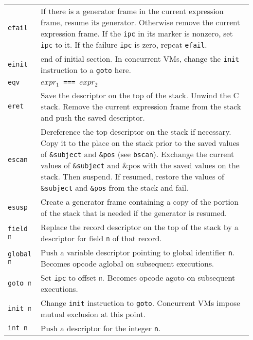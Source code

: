 \begin{xtabular}{l@{\hspace{1.5cm}}p{13.5cm}}
\texttt{efail} & If there is a generator frame in the current expression
frame, resume its generator. Otherwise remove the current expression
frame. If the \texttt{ipc} in its marker is nonzero, set \texttt{ipc} to it. If the
failure \texttt{ipc} is zero, repeat \texttt{efail}.\\

\texttt{\color{blue}einit} & end of initial section. In concurrent
 VMs, change the \texttt{init} instruction to a \texttt{goto} here. \\

\texttt{eqv}   & \texttt{$expr_1$ === $expr_2$}\\

\texttt{eret}  & Save the descriptor on the top of the stack. Unwind the C
stack. Remove the current expression frame from the stack and push the
saved descriptor.\\

\texttt{escan} & Dereference the top descriptor on the stack if necessary. Copy
it to the place on the stack prior to the saved values of \texttt{\&subject} and
\texttt{\&pos} (see \texttt{bscan}). Exchange the current values of
\texttt{\texttt{\&subject}} and \&pos with the saved values on the stack. Then
suspend. If resumed, restore the values of \texttt{\&subject} and \texttt{\&pos}
from the stack and fail.\\

\texttt{esusp} & Create a generator frame containing a copy of the portion of
the stack that is needed if the generator is resumed.\\

\texttt{field n} & Replace the record descriptor on the top of the stack by a
descriptor for field \texttt{n} of that record.\\

\texttt{global n} & Push a variable descriptor pointing to global
identifier \texttt{n}. Becomes opcode aglobal on subsequent executions.\\

\texttt{goto n} & Set \texttt{ipc} to offset \texttt{n}.
Becomes opcode agoto on subsequent executions.\\

\texttt{init n} & Change \texttt{init} instruction to \texttt{goto}.
{\color{blue}Concurrent VMs impose mutual exclusion at this point.}\\

\texttt{int n}  & Push a descriptor for the integer \texttt{n}.\\


\end{xtabular}
